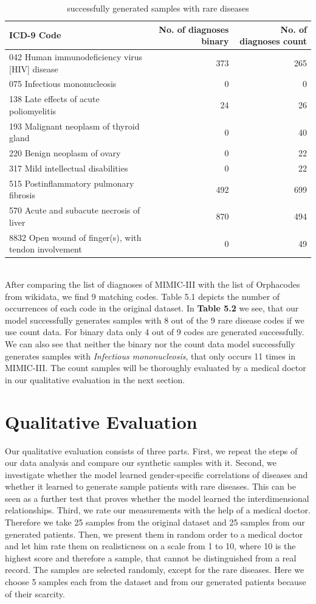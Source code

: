 \documentclass[11pt, a4paper, oneside]{book}
\begin{document}
\begin{table}
\begin{tabularx}{\textwidth}{X|r|r}
ICD-9 Code & No. of diagnoses binary & No. of diagnoses count\\
\hline
042 Human immunodeficiency virus [HIV] disease	& 373 & 265\\
075 Infectious mononucleosis & 0 & 0\\
138 Late effects of acute poliomyelitis & 24  & 26\\
193 Malignant neoplasm of thyroid gland & 0 & 40\\
220 Benign neoplasm of ovary & 0 & 22\\
317 Mild intellectual disabilities & 0 & 22\\
515 Postinflammatory pulmonary fibrosis & 492 & 699\\
570 Acute and subacute necrosis of liver & 870 & 494\\
8832 Open wound of finger(s), with tendon involvement & 0 & 49\\ 
\end{tabularx}
\caption{\label{tab:rare-generated}successfully generated samples with rare diseases}
\end{table}
\\
After comparing the list of diagnoses of MIMIC-III with the list of Orphacodes from wikidata, we find 9 matching codes. Table 5.1 depicts the number of occurrences of each code in the original dataset. In \textbf{Table 5.2} we see, that our model successfully generates samples with 8 out of the 9 rare disease codes if we use count data. For binary data only 4 out of 9 codes are generated successfully. We can also see that neither the binary nor the count data model successfully generates samples with \textit{Infectious mononucleosis}, that only occurs 11 times in MIMIC-III. 
The count samples will be thoroughly evaluated by a medical doctor in our qualitative evaluation in the next section.


\section{Qualitative Evaluation}
Our qualitative evaluation consists of three parts. First, we repeat the steps of our data analysis and compare our synthetic samples with it. Second, we investigate whether the model learned gender-specific correlations of diseases and whether it learned to generate sample patients with rare diseases. This can be seen as a further test that proves whether the model learned the interdimensional relationships. Third, we rate our measurements with the help of a medical doctor. Therefore we take 25 samples from the original dataset and 25 samples from our generated patients. Then, we present them in random order to a medical doctor and let him rate them on realisticness on a scale from 1 to 10, where 10 is the highest score and therefore a sample, that cannot be distinguished from a real record.
The samples are selected randomly, except for the rare diseases. Here we choose 5 samples each from the dataset and from our generated patients because of their scarcity.
\end{document}
